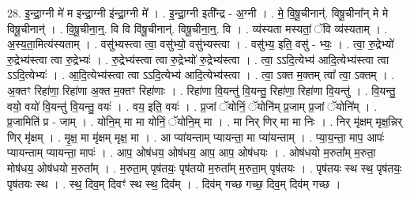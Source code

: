 \documentclass[17pt]{extarticle}
\begin{document}
28. इ॒न्द्रा॒ग्नी मे॑ म इन्द्रा॒ग्नी इ॑न्द्रा॒ग्नी मे᳚ । . इ॒न्द्रा॒ग्नी इती᳚न्द्र - अ॒ग्नी । . मे॒ वि॒षू॒चीनान्॑. विषू॒चीना᳚न् मे मे विषू॒चीनान्॑ । . वि॒षू॒चीना॒न्॒. वि वि वि॑षू॒चीनान्॑. विषू॒चीना॒न्॒. वि । . व्य॑स्यता मस्यतां॒ ॅवि व्य॑स्यताम् । . अ॒स्य॒ता॒मित्य॑स्यताम् । . वसु॑भ्यस्त्वा त्वा॒ वसु॑भ्यो॒ वसु॑भ्यस्त्वा । . वसु॑भ्य॒ इति॒ वसु॑ - भ्यः॒ । . त्वा॒ रु॒द्रेभ्यो॑ रु॒द्रेभ्य॑स्त्वा त्वा रु॒द्रेभ्यः॑ । . रु॒द्रेभ्य॑स्त्वा त्वा रु॒द्रेभ्यो॑ रु॒द्रेभ्य॑स्त्वा । . त्वा॒ ऽऽदि॒त्येभ्य॑ आदि॒त्येभ्य॑स्त्वा त्वा ऽऽदि॒त्येभ्यः॑ । . आ॒दि॒त्येभ्य॑स्त्वा त्वा ऽऽदि॒त्येभ्य॑ आदि॒त्येभ्य॑स्त्वा । . त्वा॒ ऽक्त म॒क्तम् त्वा᳚ त्वा॒ ऽक्तम् । . अ॒क्तꣳ रिहा॑णा॒ रिहा॑णा अ॒क्त म॒क्तꣳ रिहा॑णाः । . रिहा॑णा वि॒यन्तु॑ वि॒यन्तु॒ रिहा॑णा॒ रिहा॑णा वि॒यन्तु॑ । . वि॒यन्तु॒ वयो॒ वयो॑ वि॒यन्तु॑ वि॒यन्तु॒ वयः॑ । . वय॒ इति॒ वयः॑ । . प्र॒जां ॅयोनिं॒ ॅयोनि॑म् प्र॒जाम् प्र॒जां ॅयोनि᳚म् । . प्र॒जामिति॑ प्र - जाम् । . योनि॒म् मा मा योनिं॒ ॅयोनि॒म् मा । . मा निर् णिर् मा मा निः । . निर् मृ॑क्षम् मृक्ष॒न्निर् णिर् मृ॑क्षम् । . मृ॒क्ष॒ मा मृ॑क्षम् मृक्ष॒ मा । . आ प्या॑यन्ताम् प्यायन्ता॒ मा प्या॑यन्ताम् । . प्या॒य॒न्ता॒ माप॒ आपः॑ प्यायन्ताम् प्यायन्ता॒ मापः॑ । . आप॒ ओष॑धय॒ ओष॑धय॒ आप॒ आप॒ ओष॑धयः । . ओष॑धयो म॒रुता᳚म् म॒रुता॒ मोष॑धय॒ ओष॑धयो म॒रुता᳚म् । . म॒रुता॒म् पृष॑तयः॒ पृष॑तयो म॒रुता᳚म् म॒रुता॒म् पृष॑तयः । . पृष॑तयः स्थ स्थ॒ पृष॑तयः॒ पृष॑तयः स्थ । . स्थ॒ दिव॒म् दिवꣳ॑ स्थ स्थ॒ दिव᳚म् । . दिव॑म् गच्छ गच्छ॒ दिव॒म् दिव॑म् गच्छ । \newline
\end{document}

